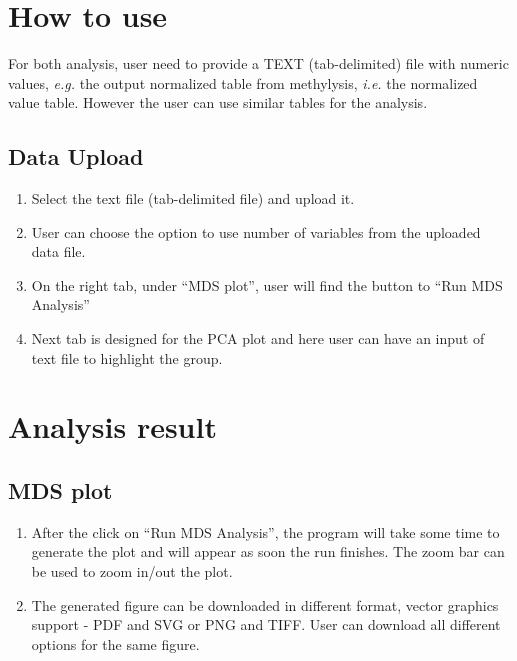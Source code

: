 \documentclass[
  a4paper,
  oneside,
  open=any]{scrreport}
\providecommand{\tightlist}{%
  \setlength{\itemsep}{0pt}\setlength{\parskip}{0pt}}\usepackage{longtable,booktabs,array}
\begin{document}
\hypertarget{how-to-use-2}{%
\section{How to use}\label{how-to-use-2}}

For both analysis, user need to provide a TEXT (tab-delimited) file with
numeric values, \emph{e.g.} the output normalized table from methylysis,
\emph{i.e.} the normalized \beta value table. However the user can use
similar tables for the analysis.

\hypertarget{data-upload}{%
\subsection{Data Upload}\label{data-upload}}

\begin{enumerate}
\def\labelenumi{\arabic{enumi}.}
\tightlist
\item
  Select the text file (tab-delimited file) and upload it.
\item
  User can choose the option to use number of variables from the
  uploaded data file.
\item
  On the right tab, under ``MDS plot'', user will find the button to
  ``Run MDS Analysis''
\item
  Next tab is designed for the PCA plot and here user can have an input
  of text file to highlight the group.
\end{enumerate}

\hypertarget{analysis-result}{%
\section{Analysis result}\label{analysis-result}}

\hypertarget{mds-plot}{%
\subsection{MDS plot}\label{mds-plot}}

\begin{enumerate}
\def\labelenumi{\arabic{enumi}.}
\tightlist
\item
  After the click on ``Run MDS Analysis'', the program will take some
  time to generate the plot and will appear as soon the run finishes.
  The zoom bar can be used to zoom in/out the plot.
\item
  The generated figure can be downloaded in different format, vector
  graphics support - PDF and SVG or PNG and TIFF. User can download all
  different options for the same figure.\\
\end{enumerate}
\end{document}
